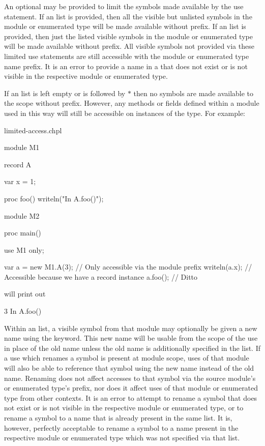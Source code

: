 
An optional  may be provided to limit the symbols made
available by the use statement.  If an  list is provided, then all
the visible but unlisted symbols in the module or enumerated type will be made
available without prefix.  If an  list is provided, then just the
listed visible symbols in the module or enumerated type will be made available
without prefix.  All visible symbols not provided via these limited use
statements are still accessible with the module or enumerated type name prefix.
It is an error to provide a name in a  that does not
exist or is not visible in the respective module or enumerated type.

If an  list is left empty or  is followed by $*$ then no
symbols are made available to the scope without prefix.  However, any methods or
fields defined within a module used in this way will still be accessible on
instances of the type.  For example:

\begin{chapelexample}{limited-access.chpl}
\begin{chapel}
module M1 {
  record A {
    var x = 1;

    proc foo() {
      writeln("In A.foo()");
    }
  }
}

module M2 {
  proc main() {
    use M1 only;

    var a = new M1.A(3); // Only accessible via the module prefix
    writeln(a.x); // Accessible because we have a record instance
    a.foo(); // Ditto
  }
}
\end{chapel}

will print out
\begin{chapelprintoutput}{}
3
In A.foo()
\end{chapelprintoutput}
\end{chapelexample}

Within an  list, a visible symbol from that module may optionally be
given a new name using the  keyword.  This new name will be usable from
the scope of the use in place of the old name unless the old name is
additionally specified in the  list.  If a use which renames a symbol
is present at module scope, uses of that module will also be able to reference
that symbol using the new name instead of the old name.  Renaming does not
affect accesses to that symbol via the source module's or enumerated type's
prefix, nor does it affect uses of that module or enumerated type from other
contexts.  It is an error to attempt to rename a symbol that does not exist or
is not visible in the respective module or enumerated type, or to rename a
symbol to a name that is already present in the same  list.  It is,
however, perfectly acceptable to rename a symbol to a name present in the
respective module or enumerated type which was not specified via
that  list.

